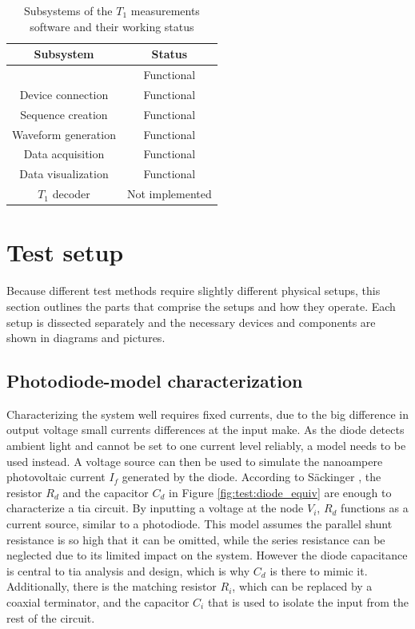 \begin{table}[ht]
	\centering
		\begin{tabular}{|c|c|}
			\hline
			Subsystem         	& Status 			\\ \hline
			\glsfmtshort{gui} 	& Functional 		\\ \hline
			Device connection 	& Functional 		\\ \hline
			Sequence creation	& Functional 		\\ \hline
			Waveform generation	& Functional 		\\ \hline
			Data acquisition	& Functional 		\\ \hline
			Data visualization	& Functional 		\\ \hline
			$T_1$ decoder		& Not implemented 	\\ \hline
		\end{tabular}
	\caption{Subsystems of the $T_1$ measurements software and their working status}
	\label{tab:test:metrics}
\end{table}



\section{Test setup}
Because different test methods require slightly different physical setups, this section outlines the parts that comprise the setups and how they operate. Each setup is dissected separately and the necessary devices and components are shown in diagrams and pictures.

\subsection{Photodiode-model characterization}
Characterizing the system well requires fixed currents, due to the big difference in output voltage small currents differences at the input make. As the diode detects ambient light and cannot be set to one current level reliably, a model needs to be used instead. A voltage source can then be used to simulate the nanoampere photovoltaic current $I_f$ generated by the diode. According to Säckinger \cite{sackinger2017analysis}, the resistor $R_d$ and the capacitor $C_d$ in Figure \ref{fig:test:diode_equiv} are enough to characterize a \gls{tia} circuit. By inputting a voltage at the node $V_i$, $R_d$ functions as a current source, similar to a photodiode. This model assumes the parallel shunt resistance is so high that it can be omitted, while the series resistance can be neglected due to its limited impact on the system. However the diode capacitance is central to \gls{tia} analysis and design, which is why $C_d$ is there to mimic it. Additionally, there is the matching resistor $R_i$, which can be replaced by a coaxial terminator, and the capacitor $C_i$ that is used to isolate the input from the rest of the circuit.


